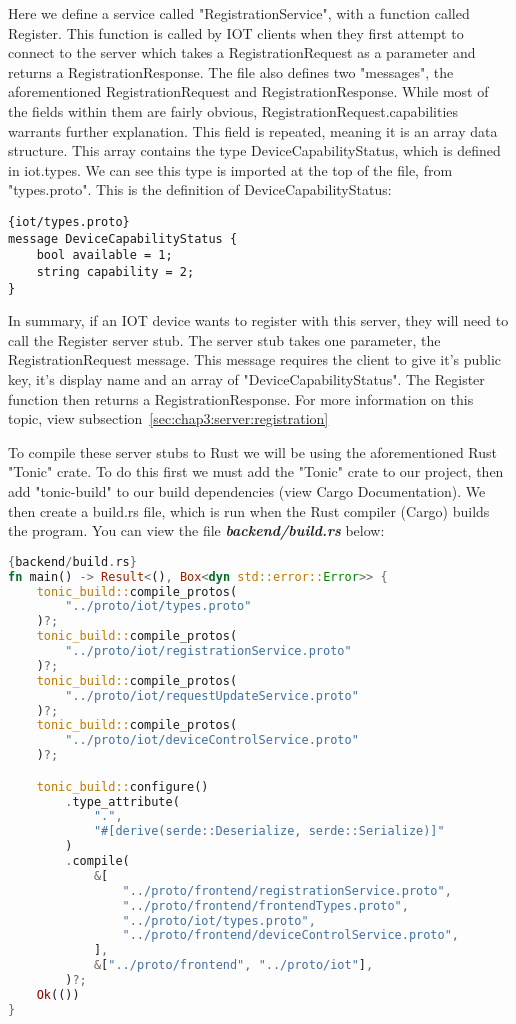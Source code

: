 Here we define a service called "RegistrationService", with a function called Register. This function is called by IOT clients when they first attempt to connect to the server which takes a RegistrationRequest as a parameter and returns a RegistrationResponse. The file also defines two "messages", the aforementioned RegistrationRequest and RegistrationResponse. While most of the fields within them are fairly obvious, RegistrationRequest.capabilities warrants further explanation.
    This field is repeated, meaning it is an array data structure. This array contains the type DeviceCapabilityStatus, which is defined in iot.types. We can see this type is imported at the top of the file, from "types.proto". This is the definition of DeviceCapabilityStatus:

\begin{lstlisting}[language=protobuf3, style=boxed]{iot/types.proto}
message DeviceCapabilityStatus {
    bool available = 1;
    string capability = 2;
}
\end{lstlisting}

In summary, if an IOT device wants to register with this server, they will need to call the Register server stub. The server stub takes one parameter, the RegistrationRequest message. This message requires the client to give it's public key, it's display name and an array of "DeviceCapabilityStatus". The Register function then returns a RegistrationResponse. For more information on this topic, view subsection~\ref{sec:chap3:server:registration}

To compile these server stubs to Rust we will be using the aforementioned Rust "Tonic" crate. To do this first we must add the "Tonic" crate to our project, then add "tonic-build" to our build dependencies (view Cargo Documentation). We then create a build.rs file, which is run when the Rust compiler (Cargo) builds the program. You can view the file \textbf{\textit{backend/build.rs}} below:

\begin{lstlisting}[language=Rust, style=boxed, showstringspaces=false]{backend/build.rs}
fn main() -> Result<(), Box<dyn std::error::Error>> {
    tonic_build::compile_protos(
        "../proto/iot/types.proto"
    )?;
    tonic_build::compile_protos(
        "../proto/iot/registrationService.proto"
    )?;
    tonic_build::compile_protos(
        "../proto/iot/requestUpdateService.proto"
    )?;
    tonic_build::compile_protos(
        "../proto/iot/deviceControlService.proto"
    )?;

    tonic_build::configure()
        .type_attribute(
            ".", 
            "#[derive(serde::Deserialize, serde::Serialize)]"
        )
        .compile(
            &[
                "../proto/frontend/registrationService.proto",
                "../proto/frontend/frontendTypes.proto",
                "../proto/iot/types.proto",
                "../proto/frontend/deviceControlService.proto",
            ],
            &["../proto/frontend", "../proto/iot"],
        )?;
    Ok(())
}
\end{lstlisting}

